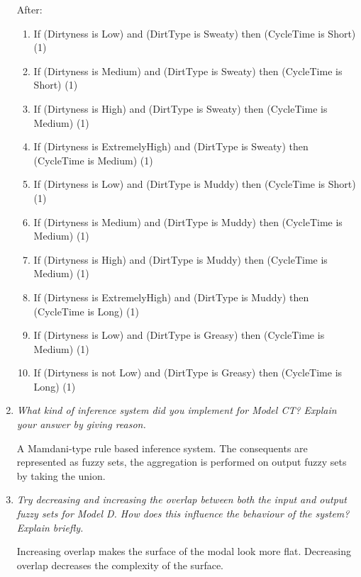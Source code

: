 \documentclass[11pt]{article}
\begin{document}
\begin{enumerate}[label=(\alph*)]
  After:
  \begin{enumerate}[label=(\arabic*)]
    \item If (Dirtyness is Low) and (DirtType is Sweaty) then (CycleTime is
    Short) (1)
    \item If (Dirtyness is Medium) and (DirtType is Sweaty) then (CycleTime is
    Short) (1)
    \item If (Dirtyness is High) and (DirtType is Sweaty) then (CycleTime is
    Medium) (1)
    \item If (Dirtyness is ExtremelyHigh) and (DirtType is Sweaty) then
    (CycleTime is Medium) (1)
    \item If (Dirtyness is Low) and (DirtType is Muddy) then (CycleTime is
    Short) (1)
    \item If (Dirtyness is Medium) and (DirtType is Muddy) then
    (CycleTime is Medium) (1)
    \item If (Dirtyness is High) and (DirtType is Muddy) then (CycleTime is
    Medium) (1)
    \item If (Dirtyness is ExtremelyHigh) and (DirtType is Muddy) then
    (CycleTime is Long) (1)
    \item If (Dirtyness is Low) and (DirtType is Greasy) then (CycleTime is
    Medium) (1)
    \item If (Dirtyness is not Low) and (DirtType is Greasy) then (CycleTime is
    Long) (1)
  \end{enumerate}

  \item \textit{What kind of inference system did you implement for Model CT?
  Explain your answer by giving reason.}

  A Mamdani-type rule based inference system. The consequents are represented
  as fuzzy sets, the aggregation is performed on output fuzzy sets by taking the
  union.

  \item \textit{Try decreasing and increasing the overlap between both the input and output fuzzy sets for Model D. How does this influence the behaviour of the system? Explain briefly.}

  Increasing overlap makes the surface of the modal look more flat. Decreasing
  overlap decreases the complexity of the surface.


\end{enumerate}
\end{document}
